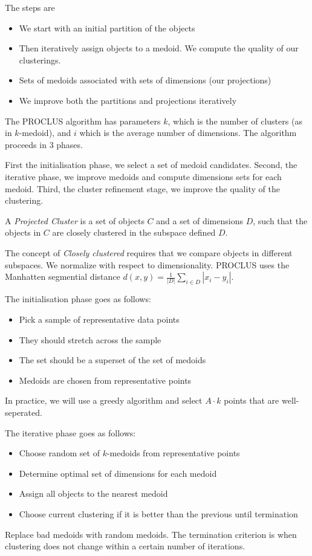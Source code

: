     The steps are
    \begin{itemize}
        \item We start with an initial partition of the objects
        \item Then iteratively assign objects to a medoid. We compute the quality of our clusterings. 
        \item Sets of medoids associated with sets of dimensions (our projections)
        \item We improve both the partitions and projections iteratively
    \end{itemize}
    
    The PROCLUS algorithm has parameters $k$, which is the number of clusters (as in $k$-medoid), and $i$ which is the average number of dimensions. The algorithm proceeds in $3$ phases. 
    
    First the initialisation phase, we select a set of medoid candidates. Second, the iterative phase, we improve medoids and compute dimensions sets for each medoid. Third, the cluster refinement stage, we improve the quality of the clustering.
    
    A \emph{Projected Cluster} is a set of objects $C$ and a set of dimensions $D$, such that the objects in $C$ are closely clustered in the subspace defined $D$. 
    
    The concept of \emph{Closely clustered} requires that we compare objects in different subspaces. We normalize with respect to dimensionality. PROCLUS uses the Manhatten segmential distance $d(x, y) = \frac{1}{|D|}\sum_{i \in D}{|x_i - y_i|}$. 
    
    The initialisation phase goes as follows: 
    \begin{itemize}
        \item Pick a sample of representative data points
        \item They should stretch across the sample
        \item The set should be a superset of the set of medoids
        \item Medoids are chosen from representative points
    \end{itemize}
    In practice, we will use a greedy algorithm and select $A \cdot k$ points that are well-seperated. 
    
    The iterative phase goes as follows:
    \begin{itemize}
        \item Choose random set of $k$-medoids from representative points
        \item Determine optimal set of dimensions for each medoid
        \item Assign all objects to the nearest medoid
        \item Choose current clustering if it is better than the previous until termination
    \end{itemize}
    Replace bad medoids with random medoids. The termination criterion is when clustering does not change within a certain number of iterations.
    

